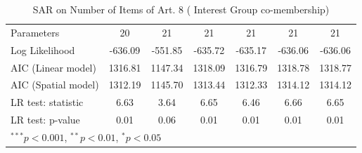\begin{table}[!h]
\begin{center}
\begin{tabular}{l c c c c c c }
Parameters              & 20           & 21           & 21           & 21           & 21           & 21           \\
Log Likelihood          & -636.09      & -551.85      & -635.72      & -635.17      & -636.06      & -636.06      \\
AIC (Linear model)      & 1316.81      & 1147.34      & 1318.09      & 1316.79      & 1318.78      & 1318.77      \\
AIC (Spatial model)     & 1312.19      & 1145.70      & 1313.44      & 1312.33      & 1314.12      & 1314.12      \\
LR test: statistic      & 6.63         & 3.64         & 6.65         & 6.46         & 6.66         & 6.65         \\
LR test: p-value        & 0.01         & 0.06         & 0.01         & 0.01         & 0.01         & 0.01         \\
\bottomrule
\multicolumn{7}{l}{\scriptsize{$^{***}p<0.001$, $^{**}p<0.01$, $^*p<0.05$}}
\end{tabular}
\caption{SAR on Number of Items of Art. 8 ( Interest Group co-membership)}
\label{table:coefficients}
\end{center}
\end{table}
